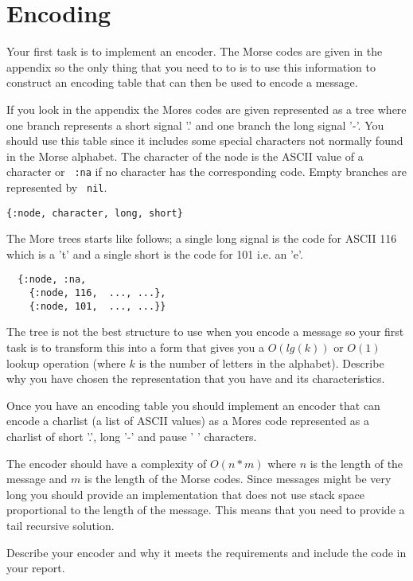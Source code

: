 \documentclass[a4paper,11pt]{article}
\begin{document}
\section{Encoding}

Your first task is to implement an encoder. The Morse codes are given
in the appendix so the only thing that you need to to is to use this
information to construct an encoding table that can then be used to
encode a message.

If you look in the appendix the Mores codes are given represented as a
tree where one branch represents a short signal '.' and one branch the
long signal '-'. You should use this table since it includes some
special characters not normally found in the Morse alphabet. The
character of the node is the ASCII value of a character or \verb+ :na+
if no character has the corresponding code. Empty branches are
represented by \verb+ nil+.

\begin{verbatim}
{:node, character, long, short}
\end{verbatim}

The More trees starts like follows; a single long signal is the code
for ASCII 116 which is a 't' and a single short is the code for 101
i.e. an 'e'.

\begin{verbatim}
  {:node, :na,
    {:node, 116,  ..., ...},
    {:node, 101,  ..., ...}}
\end{verbatim}

The tree is not the best structure to use when you encode a message so
your first task is to transform this into a form that gives you a
$O(lg(k))$ or $O(1)$ lookup operation (where $k$ is the number of
letters in the alphabet). Describe why you have chosen the
representation that you have and its characteristics.

Once you have an encoding table you should implement an encoder that
can encode a charlist (a list of ASCII values) as a Mores code
represented as a charlist of short '.', long '-' and pause ' ' characters.

The encoder should have a complexity of $O(n * m)$ where $n$ is the
length of the message and $m$ is the length of the Morse codes. Since
messages might be very long you should provide an implementation that
does not use stack space proportional to the length of the
message. This means that you need to provide a tail recursive
solution.

Describe your encoder and why it meets the requirements and include
the code in your report.
\end{document}
